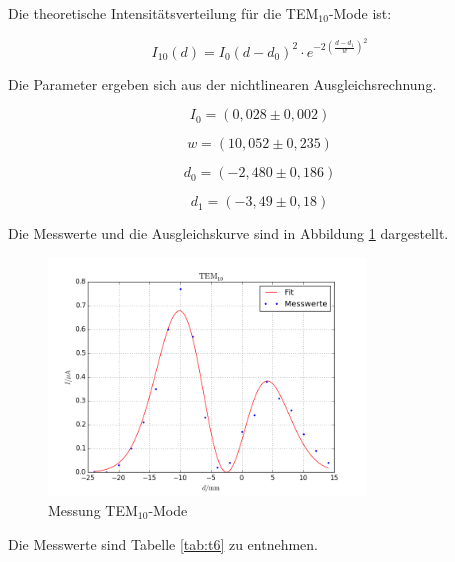 \noindent Die theoretische Intensitätsverteilung für die TEM\(_{10}\)-Mode ist:

\begin{equation}
I_{10}(d)=I_0(d-d_0)^2\cdot e^{-2\left(\frac{d-d_1}{w}\right)^2}
\end{equation}

\noindent Die Parameter ergeben sich aus der nichtlinearen Ausgleichsrechnung.

\begin{equation*}
I_0=(0,028\pm0,002)
\end{equation*}

\begin{equation*}
w=(10,052\pm0,235)
\end{equation*}

\begin{equation*}
d_0=(-2,480\pm0,186)
\end{equation*}

\begin{equation*}
d_1=(-3,49\pm0,18)
\end{equation*}

\noindent Die Messwerte und die Ausgleichskurve sind in Abbildung \ref{fig:TEM10} dargestellt. 

\begin{figure}[H]
	\centering
	\includegraphics[width=0.75\textwidth]{plots/TEM10}
	\caption{Messung TEM\(_{10}\)-Mode}
	\label{fig:TEM10}
\end{figure}

\noindent Die Messwerte sind Tabelle \ref{tab:t6} zu entnehmen.

